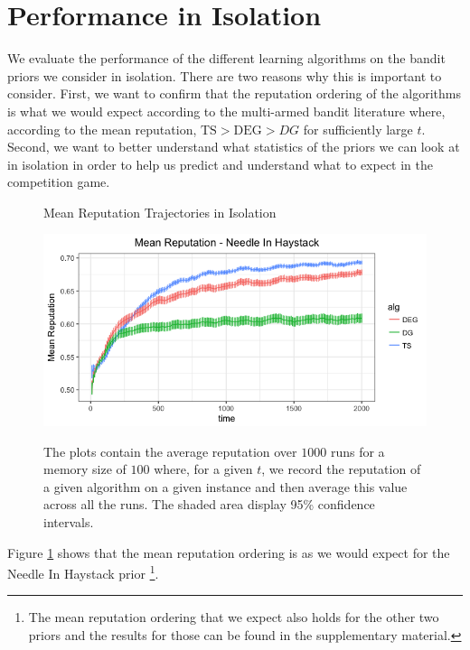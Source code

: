 \documentclass[letterpaper]{article}
\theoremstyle{definition}
\newcommand{\TS}{\mathrm{TS}}
\newcommand{\DEG}{\mathrm{DEG}}
\begin{document}
\section{Performance in Isolation}\label{section:4}

We evaluate the performance of the different learning algorithms on the bandit priors we consider in isolation. There are two reasons why this is important to consider. First, we want to confirm that the reputation ordering of the algorithms is what we would expect according to the multi-armed bandit literature where, according to the mean reputation, $\TS > \DEG > DG$ for sufficiently large $t$. Second, we want to better understand what statistics of the priors we can look at in isolation in order to help us predict and understand what to expect in the competition game.

\begin{figure}
\caption{Mean Reputation Trajectories in Isolation}
\includegraphics[scale=0.35]{"figures/nih_iso_mean"}
\label{prelim_means}
\caption*{\tiny{The plots contain the average reputation over $1000$ runs for a memory size of $100$ where, for a given $t$, we record the reputation of a given algorithm on a given instance and then average this value across all the runs. The shaded area display 95\% confidence intervals.}}
\end{figure}

Figure \ref{prelim_means} shows that the mean reputation ordering is as we would expect for the Needle In Haystack prior \footnote{The mean reputation ordering that we expect also holds for the other two priors and the results for those can be found in the supplementary material.}.
\end{document}
